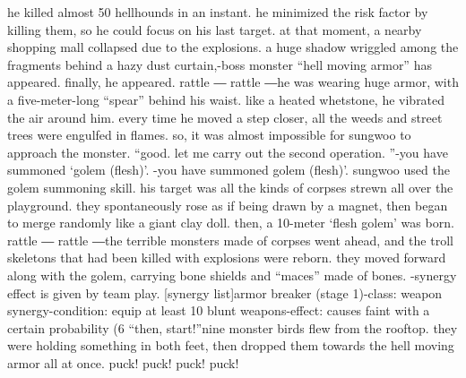 he killed almost 50 hellhounds in an instant.
 he minimized the risk factor by killing them, so he could focus on his last target.
at that moment, a nearby shopping mall collapsed due to the explosions.
a huge shadow wriggled among the fragments behind a hazy dust curtain,-boss monster “hell moving armor” has appeared.
finally, he appeared.
rattle ― rattle ―he was wearing huge armor, with a five-meter-long “spear” behind his waist.
like a heated whetstone, he vibrated the air around him.
every time he moved a step closer, all the weeds and street trees were engulfed in flames.
so, it was almost impossible for sungwoo to approach the monster.
“good.
 let me carry out the second operation.
”-you have summoned ‘golem (flesh)’.
-you have summoned golem (flesh)’.
sungwoo used the golem summoning skill.
 his target was all the kinds of corpses strewn all over the playground.
 they spontaneously rose as if being drawn by a magnet, then began to merge randomly like a giant clay doll.
 then, a 10-meter ‘flesh golem’ was born.
rattle ― rattle ―the terrible monsters made of corpses went ahead, and the troll skeletons that had been killed with explosions were reborn.
 they moved forward along with the golem, carrying bone shields and “maces” made of bones.
-synergy effect is given by team play.
[synergy list]armor breaker (stage 1)-class: weapon synergy-condition: equip at least 10 blunt weapons-effect: causes faint with a certain probability (6%
“then, start!”nine monster birds flew from the rooftop.
 they were holding something in both feet, then dropped them towards the hell moving armor all at once.
puck! puck! puck! puck!

 
